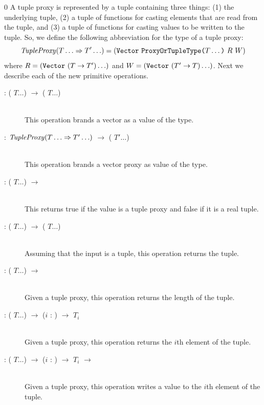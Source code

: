 \documentclass[7x10]{TimesAPriori_MIT}%
\def\racketEd{0}
\def\edition{1}
\numberwithin{theorem}{chapter}
\numberwithin{definition}{chapter}
\numberwithin{equation}{chapter}
\begin{document}
{\if\edition\racketEd    
A tuple proxy is represented by a tuple containing three things: (1) the
underlying tuple, (2) a tuple of functions for casting elements that
are read from the tuple, and (3) a tuple of functions for casting
values to be written to the tuple. So, we define the following
abbreviation for the type of a tuple proxy:
\[
\mathit{TupleProxy} (T\ldots \Rightarrow T'\ldots)
= (\text{\texttt{Vector}}~\texttt{ProxyOrTupleType}\texttt{(} T\ldots\texttt{)} ~R~ W)
\]
where $R = (\text{\texttt{Vector}}~(T\to T') \ldots)$ and
$W = (\text{\texttt{Vector}}~(T'\to T) \ldots)$.
%
Next we describe each of the new primitive operations.

\begin{description}
\item[ : ( $T \ldots$) $\to$
  ( $T \ldots$)]\ \\
%
  This operation brands a vector as a value of the  type.
\item[ : $\mathit{TupleProxy}(T\ldots \Rightarrow T'\ldots)$
  $\to$ ( $T' \ldots$)]\ \\
%
  This operation brands a vector proxy as value of the  type.
\item[ : ( $T \ldots$) $\to$
  \BOOLTY{}] \ \\
%
  This returns true if the value is a tuple proxy and false if it is a
  real tuple.
\item[ : ( $T \ldots$) $\to$
  ( $T \ldots$)]\ \\
%
  Assuming that the input is a tuple, this operation returns the
  tuple.
  
\item[ : ( $T \ldots$)
  $\to$ \INTTY{}]\ \\
%
  Given a tuple proxy, this operation returns the length of the tuple.
  
\item[ : ( $T \ldots$)
  $\to$ ($i$ : \INTTY{}) $\to$ $T_i$]\ \\
%
  Given a tuple proxy, this operation returns the $i$th element of the
  tuple.
  
\item[ : ( $T \ldots$) $\to$ ($i$
  : \INTTY{}) $\to$ $T_i$ $\to$ ]\ \\
  Given a tuple proxy, this operation writes a value to the $i$th element
  of the tuple.
\end{description}
\fi}
\end{document}
